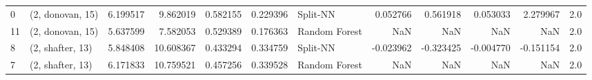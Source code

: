 \begin{tabular}{llrrrrlrrrrr}
0  &  (2, donovan, 15) &  6.199517 &   9.862019 &   0.582155 &  0.229396 &       Split-NN &        0.052766 &      0.561918 &       0.053033 &     2.279967 &            2.0 \\
11 &  (2, donovan, 15) &  5.637599 &   7.582053 &   0.529389 &  0.176363 &  Random Forest &             NaN &           NaN &            NaN &          NaN &            2.0 \\
8  &  (2, shafter, 13) &  5.848408 &  10.608367 &   0.433294 &  0.334759 &       Split-NN &       -0.023962 &     -0.323425 &      -0.004770 &    -0.151154 &            2.0 \\
7  &  (2, shafter, 13) &  6.171833 &  10.759521 &   0.457256 &  0.339528 &  Random Forest &             NaN &           NaN &            NaN &          NaN &            2.0 \\
\bottomrule
\end{tabular}
